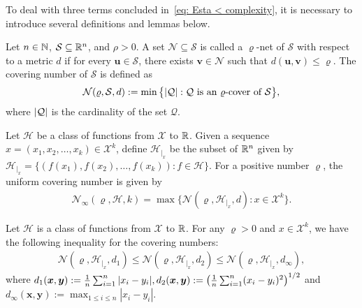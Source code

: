     To deal with three terms concluded in~\eqref{eq: Esta < complexity}, it is necessary to introduce several definitions and lemmas below.
    \begin{definition}\label{def: covering number}
        Let $n \in \mathbb{N}$, $\mathcal{S} \subseteq \mathbb{R}^n$, and $\rho > 0$. A set $\mathcal{N} \subseteq \mathcal{S}$ is called a $\varrho$-net of $\mathcal{S}$ with respect to a metric $d$ if for every $\bm{u} \in \mathcal{S}$, there exists $\bm{v} \in \mathcal{N}$ such that $d(\bm{u}, \bm{v}) \leq \varrho$. The covering number of $\mathcal{S}$ is defined as
        \begin{align*}
        \mathcal{N}(\varrho, \mathcal{S}, d) := \min\big\{\vert{\mathcal{Q}}\vert: \mathcal{Q} \text{ is an $\varrho$-cover of }\mathcal{S}\big\},
        \end{align*}
        where $\vert{\mathcal{Q}}\vert$ is the cardinality of the set $\mathcal{Q}$.
    \end{definition}
    
    \begin{definition}\label{def: uniform covering number}
        Let $\mathcal{H}$ be a class of functions from $\mathcal{X}$ to $\mathbb{R}$. Given a sequence $x = (x_1, x_2, \ldots, x_k) \in \mathcal{X}^k$, define $\mathcal{H}_{\vert_x}$ be the subset of $\mathbb{R}^n$ given by $\mathcal{H}_{\vert_x} = \{(f(x_1), f(x_2), \ldots, f(x_k)): f \in \mathcal{H}\}$. For a positive number $\varrho$, the uniform covering number is given by
        \begin{align*}
            \mathcal{N}_\infty(\varrho, \mathcal{H}, k) = \max\big\{\mathcal{N}(\varrho, \mathcal{H}_{\vert_x}, d): x \in \mathcal{X}^k\big\}.
        \end{align*}
    \end{definition}

    \begin{lemma}\label{lemma: N1 < N2 < N∞}
        Let $\mathcal{H}$ is a class of functions from $\mathcal{X}$ to $\mathbb{R}$. For any $\varrho > 0$ and $x \in \mathcal{X}^k$, we have the following inequality for the covering numbers:
        \begin{align*}
            \mathcal{N}(\varrho, \mathcal{H}_{\vert_x}, d_1) \leq \mathcal{N}(\varrho, \mathcal{H}_{\vert_x}, d_2) \leq \mathcal{N}(\varrho, \mathcal{H}_{\vert_x},d_\infty),
        \end{align*}
        where $d_1(\bm{x}, \bm{y}) := \frac{1}{n}\sum_{i=1}^n\vert{x_i - y_i}\vert, d_2(\bm{x}, \bm{y}) := \big(\frac{1}{n}\sum_{i=1}^n(x_i - y_i)^2\big)^{1/2}$ and $d_\infty(\bm{x}, \bm{y}) :=\max_{1\leq i\leq n}|x_i - y_i|$.
    \end{lemma}

